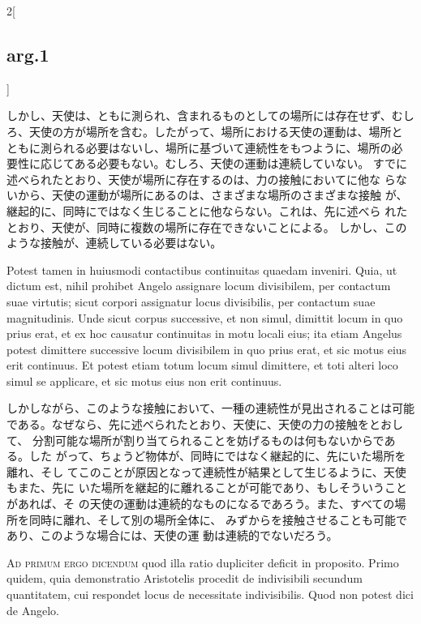 \documentclass[paper=a4paper,fontsize=10pt,jafontsize=9pt,titlepage]{jlreq}
\begin{document}
\begin{paracol}{2}[\subsection{arg.1}]
\switchcolumn

しかし、天使は、ともに測られ、含まれるものとしての場所には存在せず、むし
 ろ、天使の方が場所を含む。したがって、場所における天使の運動は、場所と
 ともに測られる必要はないし、場所に基づいて連続性をもつように、場所の必
 要性に応じてある必要もない。むしろ、天使の運動は連続していない。
すでに述べられたとおり、天使が場所に存在するのは、力の接触においてに他な
 らないから、天使の運動が場所にあるのは、さまざまな場所のさまざまな接触
 が、継起的に、同時にではなく生じることに他ならない。これは、先に述べら
 れたとおり、天使が、同時に複数の場所に存在できないことによる。
しかし、このような接触が、連続している必要はない。

\switchcolumn*

Potest tamen in huiusmodi
contactibus continuitas quaedam inveniri. Quia, ut dictum est, nihil
prohibet Angelo assignare locum divisibilem, per contactum suae
virtutis; sicut corpori assignatur locus divisibilis, per contactum suae
magnitudinis. Unde sicut corpus successive, et non simul, dimittit locum
in quo prius erat, et ex hoc causatur continuitas in motu locali eius;
ita etiam Angelus potest dimittere successive locum divisibilem in quo
prius erat, et sic motus eius erit continuus. Et potest etiam totum
locum simul dimittere, et toti alteri loco simul se applicare, et sic
motus eius non erit continuus.

\switchcolumn

しかしながら、このような接触において、一種の連続性が見出されることは可能
 である。なぜなら、先に述べられたとおり、天使に、天使の力の接触をとおして、
 分割可能な場所が割り当てられることを妨げるものは何もないからである。した
 がって、ちょうど物体が、同時にではなく継起的に、先にいた場所を離れ、そし
 てこのことが原因となって連続性が結果として生じるように、天使もまた、先に
 いた場所を継起的に離れることが可能であり、もしそういうことがあれば、そ
 の天使の運動は連続的なものになるであろう。また、すべての場所を同時に離れ、そして別の場所全体に、
 みずからを接触させることも可能であり、このような場合には、天使の運
 動は連続的でないだろう。

\switchcolumn*[\subsection{ad.1}]

{\scshape Ad primum ergo dicendum} quod illa ratio
dupliciter deficit in proposito. Primo quidem, quia demonstratio
Aristotelis procedit de indivisibili secundum quantitatem, cui respondet
locus de necessitate indivisibilis. Quod non potest dici de
Angelo.


\end{paracol}
\end{document}
